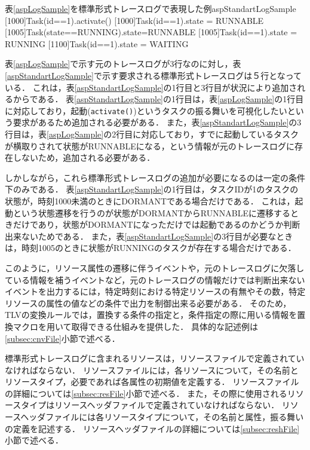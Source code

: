 \begin{File}{表\ref{aspLogSample}を標準形式トレースログで表現した例}{aspStandartLogSample}
[1000]Task(id==1).activate()
[1000]Task(id==1).state = RUNNABLE
[1005]Task(state==RUNNING).state=RUNNABLE
[1005]Task(id==1).state = RUNNING
[1100]Task(id==1).state = WAITING
\end{File}

表\ref{aspLogSample}で示す元のトレースログが3行なのに対し，表\ref{aspStandartLogSample}で示す要求される標準形式トレースログは５行となっている．
これは，表\ref{aspStandartLogSample}の1行目と3行目が状況により追加されるからである．
表\ref{aspStandartLogSample}の1行目は，表\ref{aspLogSample}の1行目に対応しており，起動(\verb|activate()|)というタスクの振る舞いを可視化したいという要求があるため追加される必要がある．
また，表\ref{aspStandartLogSample}の3行目は，表\ref{aspLogSample}の2行目に対応しており，すでに起動しているタスクが横取りされて状態がRUNNABLEになる，という情報が元のトレースログに存在しないため，追加される必要がある．

しかしながら，これら標準形式トレースログの追加が必要になるのは一定の条件下のみである．
表\ref{aspStandartLogSample}の1行目は，タスクIDが1のタスクの状態が，時刻1000未満のときにDORMANTである場合だけである．
これは，起動という状態遷移を行うのが状態がDORMANTからRUNNABLEに遷移するときだけであり，状態がDORMANTになっただけでは起動であるのかどうか判断出来ないためである．
また，表\ref{aspStandartLogSample}の3行目が必要なときは，時刻1005のときに状態がRUNNINGのタスクが存在する場合だけである．

このように，リソース属性の遷移に伴うイベントや，元のトレースログに欠落している情報を補うイベントなど，元のトレースログの情報だけでは判断出来ないイベントを出力するには，特定時刻における特定リソースの有無やその数，特定リソースの属性の値などの条件で出力を制御出来る必要がある．
そのため，TLVの変換ルールでは，置換する条件の指定と，条件指定の際に用いる情報を置換マクロを用いて取得できる仕組みを提供した．
具体的な記述例は\ref{subsec:cnvFile}小節で述べる．

標準形式トレースログに含まれるリソースは，リソースファイルで定義されていなければならない．
リソースファイルには，各リソースについて，その名前とリソースタイプ，必要であれば各属性の初期値を定義する．
リソースファイルの詳細については\ref{subsec:resFile}小節で述べる．
また，その際に使用されるリソースタイプはリソースヘッダファイルで定義されていなければならない．
リソースヘッダファイルには各リソースタイプについて，その名前と属性，振る舞いの定義を記述する．
リソースヘッダファイルの詳細については\ref{subsec:reshFile}小節で述べる．

